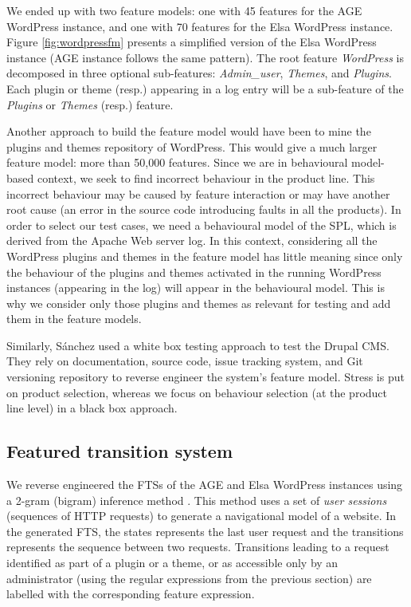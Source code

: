 We ended up with two feature models: one with 45 features for the AGE WordPress instance, and one with 70 features for the Elsa WordPress instance. Figure \ref{fig:wordpressfm} presents a simplified version of the Elsa WordPress instance (AGE instance follows the same pattern).
The root feature \textit{WordPress} is decomposed in three optional sub-features: \textit{Admin\_user}, \textit{Themes}, and \textit{Plugins}. Each plugin or theme (resp.) appearing in a log entry will be a sub-feature of the \textit{Plugins} or \textit{Themes} (resp.) feature. 

Another approach to build the feature model would have been to mine the plugins and themes repository of WordPress. This would give a much larger feature model: more than 50,000 features. Since we are in behavioural model-based context, we seek to find incorrect behaviour in the product line. This incorrect behaviour may be caused by feature interaction or may have another root cause (\eg an error in the source code introducing faults in all the products). In order to select our test cases, we need a behavioural model of the SPL, which is derived from the Apache  Web server log. In this context, considering all the WordPress plugins and themes in the feature model has little meaning since only the behaviour of the plugins and themes activated in the running WordPress instances (appearing in the log) will appear in the behavioural model. This is why we consider only those plugins and themes as relevant for testing and add them in the feature models. 

Similarly, S\'anchez \etal \cite{Sanchez2013a,Sanchez2017} used a white box testing approach to test the Drupal CMS. They rely on documentation, source code, issue tracking system, and Git versioning repository to reverse engineer the system's feature model. Stress is put on product selection, whereas we focus on behaviour selection (at the product line level) in a black box approach. 

\subsection{Featured transition system} 

\label{subsec:wordpress:fts}

We reverse engineered the FTSs of the AGE and Elsa WordPress instances using a 2-gram (bigram) inference method \cite{Sprenkle2011a,Sprenkle2013}. This method uses a set of \emph{user sessions} (\ie sequences of HTTP requests) to generate a navigational model of a website. In the generated FTS, the states represents the last user request and the transitions represents the sequence between two requests. Transitions leading to a request identified as part of a plugin or a theme, or as accessible only by an administrator (using the regular expressions from the previous section) are labelled with the corresponding feature expression.

